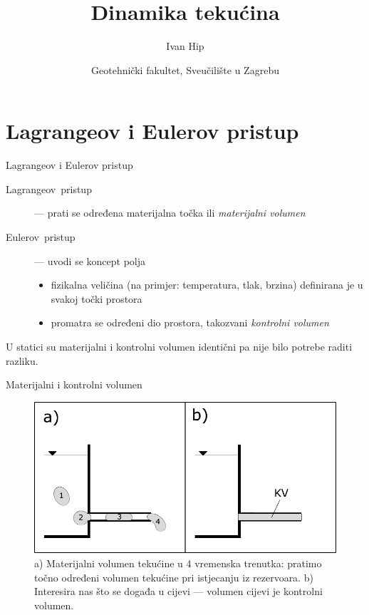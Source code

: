 \documentclass[croatian]{beamer}
\begin{document}
\title{Dinamika tekućina}
\author{Ivan Hip}
\date{Geotehnički fakultet, Sveučilište u Zagrebu}

\begin{frame}
\titlepage
\end{frame}

\section{Lagrangeov i Eulerov pristup}

\begin{frame}{Lagrangeov i Eulerov pristup}

\begin{description}
\item [{Lagrangeov~pristup}] --- prati se određena materijalna točka
ili \emph{materijalni volumen}
\item [{Eulerov~pristup}] --- uvodi se koncept polja

\begin{itemize}
\item fizikalna veličina (na primjer: temperatura, tlak, brzina) definirana
je u svakoj točki prostora
\item promatra se određeni dio prostora, takozvani \emph{kontrolni volumen}
\end{itemize}

\end{description}
U statici su materijalni i kontrolni volumen identični pa nije bilo
potrebe raditi razliku.
\end{frame}

\begin{frame}{Materijalni i kontrolni volumen}

\begin{figure}
\begin{centering}
\includegraphics[width=0.8\paperwidth]{figs/slika-mat-vs-kont}
\par\end{centering}
\caption{a) Materijalni volumen tekućine u 4 vremenska trenutka: pratimo točno
određeni volumen tekućine pri istjecanju iz rezervoara. b) Interesira
nas što se događa u cijevi --- volumen cijevi je kontrolni volumen.}
\end{figure}
\end{frame}
\end{document}
